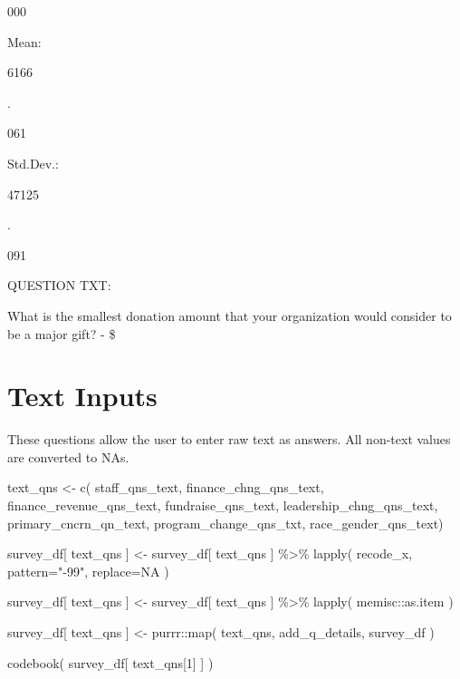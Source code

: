 \documentclass[
  letterpaper,
]{scrbook}
\newenvironment{Shaded}{\begin{snugshade}}{\end{snugshade}}
\newcommand{\AttributeTok}[1]{\textcolor[rgb]{0.40,0.45,0.13}{#1}}
\newcommand{\ConstantTok}[1]{\textcolor[rgb]{0.56,0.35,0.01}{#1}}
\newcommand{\DecValTok}[1]{\textcolor[rgb]{0.68,0.00,0.00}{#1}}
\newcommand{\FunctionTok}[1]{\textcolor[rgb]{0.28,0.35,0.67}{#1}}
\newcommand{\NormalTok}[1]{\textcolor[rgb]{0.00,0.23,0.31}{#1}}
\newcommand{\OtherTok}[1]{\textcolor[rgb]{0.00,0.23,0.31}{#1}}
\newcommand{\SpecialCharTok}[1]{\textcolor[rgb]{0.37,0.37,0.37}{#1}}
\newcommand{\StringTok}[1]{\textcolor[rgb]{0.13,0.47,0.30}{#1}}
\begin{document}
000

Mean:

6166

.

061

Std.Dev.:

47125

.

091

QUESTION TXT:

What is the smallest donation amount that your organization would
consider to be a major gift? - \$

\chapter{Text Inputs}\label{text-inputs-1}

These questions allow the user to enter raw text as answers. All
non-text values are converted to NAs.

\begin{Shaded}
\begin{Highlighting}[]
\NormalTok{text\_qns }\OtherTok{\textless{}{-}} 
  \FunctionTok{c}\NormalTok{( staff\_qns\_text, }
\NormalTok{     finance\_chng\_qns\_text, }
\NormalTok{     finance\_revenue\_qns\_text, }
\NormalTok{     fundraise\_qns\_text, }
\NormalTok{     leadership\_chng\_qns\_text, }
\NormalTok{     primary\_cncrn\_qn\_text, }
\NormalTok{     program\_change\_qns\_txt, }
\NormalTok{     race\_gender\_qns\_text)}

\NormalTok{survey\_df[ text\_qns ] }\OtherTok{\textless{}{-}} 
\NormalTok{  survey\_df[ text\_qns ] }\SpecialCharTok{\%\textgreater{}\%}
  \FunctionTok{lapply}\NormalTok{( recode\_x, }\AttributeTok{pattern=}\StringTok{"{-}99"}\NormalTok{, }\AttributeTok{replace=}\ConstantTok{NA}\NormalTok{ )}

\NormalTok{survey\_df[ text\_qns ] }\OtherTok{\textless{}{-}} 
\NormalTok{  survey\_df[ text\_qns ] }\SpecialCharTok{\%\textgreater{}\%}
  \FunctionTok{lapply}\NormalTok{( memisc}\SpecialCharTok{::}\NormalTok{as.item )}

\NormalTok{survey\_df[ text\_qns ] }\OtherTok{\textless{}{-}}\NormalTok{ purrr}\SpecialCharTok{::}\FunctionTok{map}\NormalTok{( text\_qns, add\_q\_details, survey\_df )}

\FunctionTok{codebook}\NormalTok{( survey\_df[ text\_qns[}\DecValTok{1}\NormalTok{] ] )}
\end{Highlighting}
\end{Shaded}
\end{document}
